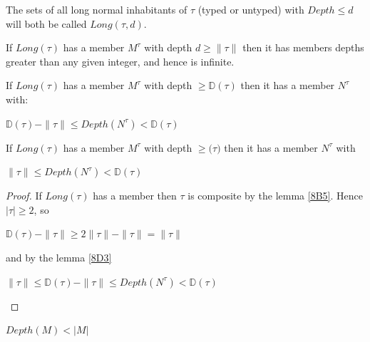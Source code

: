 \documentclass[a4paper,10pt]{article}
\begin{document}
\begin{notation} The sets of all long normal inhabitants of $\tau$ (typed or untyped) with $Depth \leq d$ will both be called $Long(\tau,d)$.  
\end{notation}

  
\begin{lem}\label{8D2} If $Long(\tau)$ has a member $M^{\tau}$ with depth $d \geq \rVert\tau\rVert$ then it has members depths greater than any given integer,
and hence is infinite.
\end{lem}

\begin{lem}\label{8D3} If $Long(\tau)$ has a member $M^{\tau}$ with depth $\geq \mathbb{D}(\tau)$ then it has a member $N^{\tau}$ with:
\begin{center}
$\mathbb{D}(\tau) - \rVert\tau\rVert \leq Depth(N^{\tau}) < \mathbb{D}(\tau)$ 
\end{center}
\end{lem}

\begin{col}\label{8D3.1} If $Long(\tau)$ has a member $M^{\tau}$ with depth $\geq \mathbb(\tau)$ then it has a member $N^{\tau}$ with 
\begin{center}
 $\rVert\tau\rVert \leq Depth(N^{\tau}) < \mathbb{D}(\tau)$
\end{center}
\begin{proof}
If $Long(\tau)$ has a member then $\tau$ is composite by the lemma \ref{8B5}. Hence $\rvert \tau \rvert \geq 2$, so
\begin{center}
$\mathbb{D}(\tau) - \rVert\tau\rVert \geq 2 \rVert\tau\rVert - \rVert\tau\rVert = \rVert\tau\rVert$ 
\end{center}
and by the lemma \ref{8D3}
\begin{center}
$ \rVert\tau\rVert \leq \mathbb{D}(\tau) - \rVert\tau\rVert \leq Depth(N^{\tau}) < \mathbb{D}(\tau)$  
\end{center}

\end{proof}
\end{col}


\begin{lem}
$Depth(M) < |M|$
\end{lem}
\end{document}
